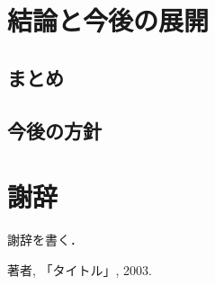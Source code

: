 \documentclass{funthesis}
\begin{document}


\chapter{結論と今後の展開}

\section{まとめ}




\section{今後の方針}



\chapter*{謝辞}

謝辞を書く．


\begin{thebibliography}{9}
  著者, 「タイトル」, 2003.
\end{thebibliography}
\end{document}
